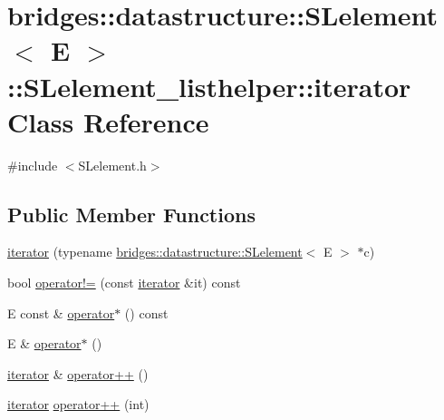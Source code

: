 \hypertarget{classbridges_1_1datastructure_1_1_s_lelement_1_1_s_lelement__listhelper_1_1iterator}{}\section{bridges\+:\+:datastructure\+:\+:S\+Lelement$<$ E $>$\+:\+:S\+Lelement\+\_\+listhelper\+:\+:iterator Class Reference}
\label{classbridges_1_1datastructure_1_1_s_lelement_1_1_s_lelement__listhelper_1_1iterator}


{\ttfamily \#include $<$S\+Lelement.\+h$>$}

\subsection*{Public Member Functions}
\begin{DoxyCompactItemize}
\item 
\hyperlink{classbridges_1_1datastructure_1_1_s_lelement_1_1_s_lelement__listhelper_1_1iterator_a1144192d651fcb5b12eb8cb33dc8d554}{iterator} (typename \hyperlink{classbridges_1_1datastructure_1_1_s_lelement}{bridges\+::datastructure\+::\+S\+Lelement}$<$ E $>$ $\ast$c)
\item 
bool \hyperlink{classbridges_1_1datastructure_1_1_s_lelement_1_1_s_lelement__listhelper_1_1iterator_a2bfd8ffd134a55488f27d1263d3c95a4}{operator!=} (const \hyperlink{classbridges_1_1datastructure_1_1_s_lelement_1_1_s_lelement__listhelper_1_1iterator}{iterator} \&it) const
\item 
E const  \& \hyperlink{classbridges_1_1datastructure_1_1_s_lelement_1_1_s_lelement__listhelper_1_1iterator_a2212bbad66903bdc0051ebeb21119ea2}{operator$\ast$} () const
\item 
E \& \hyperlink{classbridges_1_1datastructure_1_1_s_lelement_1_1_s_lelement__listhelper_1_1iterator_af38cfaf00efb8cc5e7ba0d2328e9e081}{operator$\ast$} ()
\item 
\hyperlink{classbridges_1_1datastructure_1_1_s_lelement_1_1_s_lelement__listhelper_1_1iterator}{iterator} \& \hyperlink{classbridges_1_1datastructure_1_1_s_lelement_1_1_s_lelement__listhelper_1_1iterator_ab5847041e6e49fa6bcfd5efe6d2a1e1a}{operator++} ()
\item 
\hyperlink{classbridges_1_1datastructure_1_1_s_lelement_1_1_s_lelement__listhelper_1_1iterator}{iterator} \hyperlink{classbridges_1_1datastructure_1_1_s_lelement_1_1_s_lelement__listhelper_1_1iterator_a1d064c9534883c1b673beaec5fef6140}{operator++} (int)
\end{DoxyCompactItemize}


